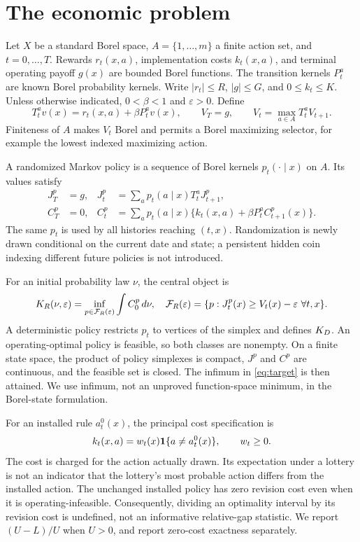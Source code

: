 \section{The economic problem}\label{sec:model}
Let $X$ be a standard Borel space, $A=\{1,\ldots,m\}$ a finite action set, and $t=0,\ldots,T$. Rewards $r_t(x,a)$, implementation costs $k_t(x,a)$, and terminal operating payoff $g(x)$ are bounded Borel functions. The transition kernels $P_t^a$ are known Borel probability kernels. Write $|r_t|\leq R$, $|g|\leq G$, and $0\leq k_t\leq K$. Unless otherwise indicated, $0<\beta<1$ and $\varepsilon>0$. Define
\begin{equation}\label{eq:bellman}
 T_t^a v(x)=r_t(x,a)+\beta P_t^a v(x),\qquad
 V_T=g,\qquad V_t=\max_{a\in A}T_t^aV_{t+1}.
\end{equation}
Finiteness of $A$ makes $V_t$ Borel and permits a Borel maximizing selector, for example the lowest indexed maximizing action.

A randomized Markov policy is a sequence of Borel kernels $p_t(\cdot\mid x)$ on $A$. Its values satisfy
\begin{align}
 J_T^p&=g,& J_t^p&=\sum_a p_t(a\mid x)T_t^aJ_{t+1}^p,\label{eq:operating}\\
 C_T^p&=0,& C_t^p&=\sum_a p_t(a\mid x)\{k_t(x,a)+\beta P_t^aC_{t+1}^p(x)\}.\label{eq:cost}
\end{align}
The same $p_t$ is used by all histories reaching $(t,x)$. Randomization is newly drawn conditional on the current date and state; a persistent hidden coin indexing different future policies is not introduced.

For an initial probability law $\nu$, the central object is
\begin{equation}\label{eq:target}
 K_R(\nu,\varepsilon)=\inf_{p\in\mathcal F_R(\varepsilon)}\int C_0^p\,d\nu,
 \quad
 \mathcal F_R(\varepsilon)=\{p:J_t^p(x)\geq V_t(x)-\varepsilon\ \forall t,x\}.
\end{equation}
A deterministic policy restricts $p_t$ to vertices of the simplex and defines $K_D$. An operating-optimal policy is feasible, so both classes are nonempty. On a finite state space, the product of policy simplexes is compact, $J^p$ and $C^p$ are continuous, and the feasible set is closed. The infimum in \eqref{eq:target} is then attained. We use infimum, not an unproved function-space minimum, in the Borel-state formulation.

For an installed rule $a_t^0(x)$, the principal cost specification is
\begin{equation}\label{eq:revisioncost}
 k_t(x,a)=w_t(x)\mathbf 1\{a\ne a_t^0(x)\},\qquad w_t\geq0.
\end{equation}
The cost is charged for the action actually drawn. Its expectation under a lottery is not an indicator that the lottery's most probable action differs from the installed action. The unchanged installed policy has zero revision cost even when it is operating-infeasible. Consequently, dividing an optimality interval by its revision cost is undefined, not an informative relative-gap statistic. We report $(U-L)/U$ when $U>0$, and report zero-cost exactness separately.

